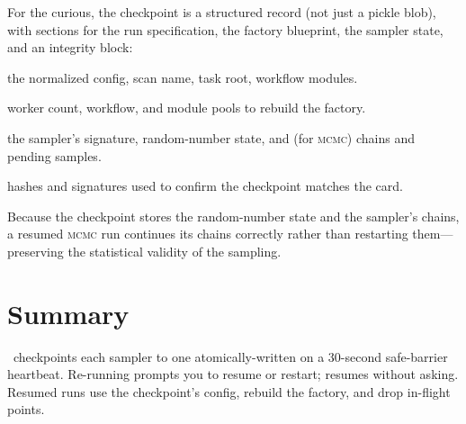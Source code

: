 For the curious, the checkpoint is a structured record (not just a pickle blob), with sections
for the run specification, the factory blueprint, the sampler state, and an integrity block:

\begin{description}[style=nextline, leftmargin=1.2em]
  \item[\code{run\_spec}] the normalized config, scan name, task root, workflow modules.
  \item[\code{factory\_blueprint}] worker count, workflow, and module pools to rebuild the factory.
  \item[\code{sampler\_state}] the sampler's signature, random-number state, and (for \textsc{mcmc})
        chains and pending samples.
  \item[\code{integrity}] hashes and signatures used to confirm the checkpoint matches the card.
\end{description}

\begin{jnote}
Because the checkpoint stores the random-number state and the sampler's chains, a resumed
\textsc{mcmc} run continues its chains correctly rather than restarting them---preserving the
statistical validity of the sampling.
\end{jnote}

\section{Summary}
\label{sec:ckpt-summary}

\Jarvis\ checkpoints each sampler to one atomically-written  on a 30-second
safe-barrier heartbeat. Re-running prompts you to resume or restart;  resumes
without asking. Resumed runs use the checkpoint's config, rebuild the factory, and drop in-flight
points.
